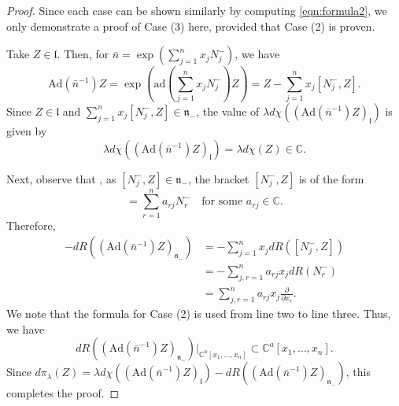 \documentclass[reqno,11pt]{amsart}
\theoremstyle{remark}
\theoremstyle{definition}
\numberwithin{equation}{section}
\newcommand{\fl}{{\mathfrak l}}
\newcommand{\fn}{{\mathfrak n}}
\newcommand{\nbar}{\bar{n}}                 %
\newcommand{\C}{\mathbb{C}}
\newcommand{\ad}{\mathrm{ad}}
\newcommand{\Ad}{\mathrm{Ad}}
\newcommand{\dpi}{d\pi}
\begin{document}
\begin{proof}
Since 
each case can be shown similarly by computing \eqref{eqn:formula2},
we only demonstrate a proof of Case (3) here, provided that Case (2) is proven.

Take $Z \in \fl$. Then, for $\nbar=\exp(\sum_{j=1}^nx_j N_j^-)$, we have 
\begin{equation*}
\Ad(\nbar^{-1})Z = \exp(\ad(\sum_{j=1}^n x_j N_j^-)Z)
=Z -\sum_{j=1}^nx_j[N_j^-,Z].
\end{equation*}
Since $Z\in \fl$ and  $\sum_{j=1}^nx_j[N_j^-,Z] \in \fn_-$,
the value of $\lambda d\chi((\Ad(\nbar^{-1})Z)_{\fl})$ is given by
\begin{equation*}
\lambda d\chi((\Ad(\nbar^{-1})Z)_{\fl}) = \lambda d\chi(Z) \in \C.
\end{equation*}

Next,
observe that , as $[N_j^-, Z] \in \fn_-$, the bracket $[N_j^-, Z]$ is of the form
\begin{equation*}
[N_j^-,Z] = \sum_{r=1}^n a_{rj}N_r^- 
\quad
\text{for some $a_{rj} \in \C$}.
\end{equation*}
Therefore,
\begin{align*}
-dR((\Ad(\nbar^{-1})Z)_{\fn_-}) 
&= -\sum_{j=1}^nx_jdR([N_j^-,Z])\\
&= -\sum_{j,r=1}^na_{rj} x_jdR(N_r^-)\\
&= \sum_{j,r=1}^na_{rj} x_j\frac{\partial}{\partial x_r}.
\end{align*}
We note that the formula for Case (2) is used from line two to line three.
Thus, we have 
\begin{equation*}
dR((\Ad(\nbar^{-1})Z)_{\fn_-}) \vert_{\C^a[x_1,\ldots, x_n]} \subset 
\C^a[x_1, \ldots, x_n].
\end{equation*}
Since $\dpi_\lambda(Z)= 
\lambda d\chi((\Ad(\nbar^{-1})Z)_{\fl}) - dR((\Ad(\nbar^{-1})Z)_{\fn_-})$,
this completes the proof.
\end{proof}
\end{document}
